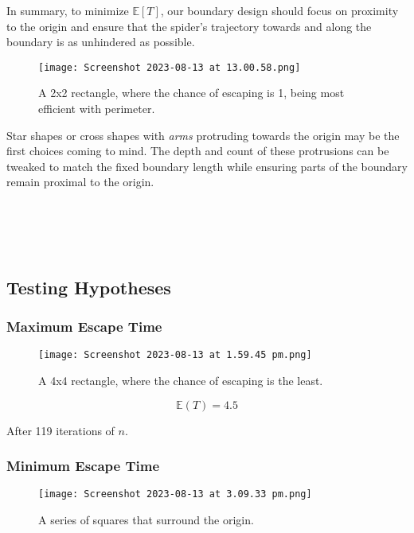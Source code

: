 \documentclass[12pt,a4paper]{article}
\begin{document}
In summary, to minimize \(\mathbb{E}[T]\), our boundary design should focus on proximity to the origin and ensure that the spider's trajectory towards and along the boundary is as unhindered as possible.

\begin{figure}[htbp]
    \centering
    \texttt{[image: Screenshot 2023-08-13 at 13.00.58.png]}
    \caption{A 2x2 rectangle, where the chance of escaping is 1, being most efficient with perimeter.}
    \label{fig:MSRC3}
\end{figure}

Star shapes or cross shapes with \textit{arms} protruding towards the origin may be the first choices coming to mind. The depth and count of these protrusions can be tweaked to match the fixed boundary length while ensuring parts of the boundary remain proximal to the origin.
\\
\\
\\
\\
\\
\subsection{Testing Hypotheses}

\subsubsection{Maximum Escape Time}

\begin{figure}[htbp]
    \centering
    \texttt{[image: Screenshot 2023-08-13 at 1.59.45 pm.png]}
    \caption{A 4x4 rectangle, where the chance of escaping is the least.}
    \label{fig:MSRC3}
\end{figure}
\begin{equation*}
    \mathbb{E}(T) = 4.5
\end{equation*}

After 119 iterations of \(n\).
\subsubsection{Minimum Escape Time}
\begin{figure}[htbp]
    \centering
    \texttt{[image: Screenshot 2023-08-13 at 3.09.33 pm.png]}
    \caption{A series of squares that surround the origin.}
    \label{fig:MSRC4}
\end{figure}
\end{document}
